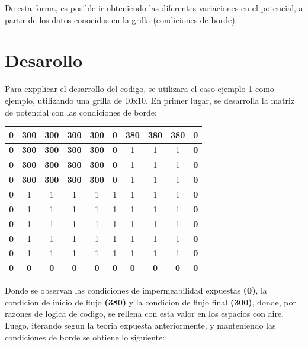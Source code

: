 De esta forma, es posible ir obteniendo las diferentes variaciones en el potencial, a partir de los datos conocidos en la grilla (condiciones de borde).

\newpage
\section{Desarollo}

Para expplicar el desarrollo del codigo, se utilizara el caso ejemplo 1 como ejemplo, utilizando una grilla de 10x10. En primer lugar, se desarrolla la matriz de potencial con las condiciones de borde:

\begin{center}
    \begin{tabular}{|c|c|c|c|c|c|c|c|c|c|} 
        \hline
        \textbf{0} & \textbf{300} & \textbf{300} & \textbf{300} & \textbf{300} & \textbf{0} & \textbf{380} & \textbf{380} & \textbf{380} & \textbf{0} \\
        \hline
        \textbf{0} & \textbf{300} & \textbf{300} & \textbf{300} & \textbf{300} & \textbf{0} & 1 & 1 & 1 & \textbf{0} \\
        \hline
        \textbf{0} & \textbf{300} & \textbf{300} & \textbf{300} & \textbf{300} & \textbf{0} & 1 & 1 & 1 & \textbf{0} \\
        \hline
        \textbf{0} & \textbf{300} & \textbf{300} & \textbf{300} & \textbf{300} & \textbf{0} & 1 & 1 & 1 & \textbf{0} \\
        \hline
        \textbf{0} & 1 & 1 & 1 & 1 & 1 & 1 & 1 & 1 & \textbf{0} \\
        \hline
        \textbf{0} & 1 & 1 & 1 & 1 & 1 & 1 & 1 & 1 & \textbf{0} \\
        \hline
        \textbf{0} & 1 & 1 & 1 & 1 & 1 & 1 & 1 & 1 & \textbf{0} \\
        \hline
        \textbf{0} & 1 & 1 & 1 & 1 & 1 & 1 & 1 & 1 & \textbf{0} \\
        \hline
        \textbf{0} & 1 & 1 & 1 & 1 & 1 & 1 & 1 & 1 & \textbf{0} \\
        \hline
        \textbf{0} & \textbf{0} & \textbf{0} & \textbf{0} & \textbf{0} & \textbf{0} & \textbf{0} & \textbf{0} & \textbf{0} & \textbf{0} \\
        \hline
    \end{tabular}
\end{center}

Donde se observan las condiciones de impermeabilidad expuestas \textbf{(0)}, la condicion de inicio de flujo \textbf{(380)} y la condicion de flujo final \textbf{(300)}, donde, por razones de logica de codigo, se rellena con esta valor en los espacios con aire. Luego, iterando segun la teoria expuesta anteriormente, y manteniendo las condiciones de borde se obtiene lo siguiente:


